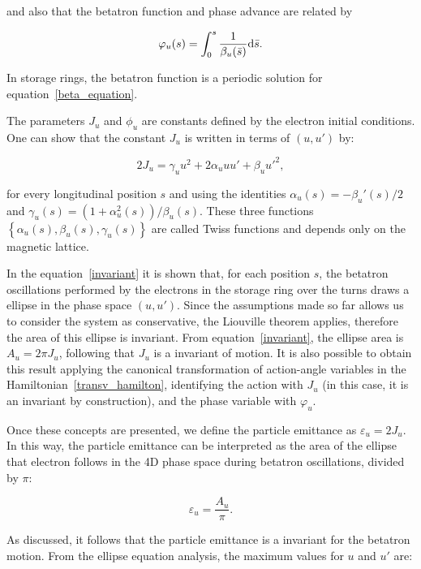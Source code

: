 and also that the betatron function and phase advance are related by

\begin{equation}
\varphi_u(s) = \int_{0}^{s} \dfrac{1}{\beta_u(\bar{s})} \mathrm{d} \bar{s}.
\end{equation}

In storage rings, the betatron function is a periodic solution for equation~\eqref{beta_equation}.

The parameters $J_u$ and $\phi_u$ are constants defined by the electron initial conditions. One can show that the constant $J_u$ is written in terms of $(u, u')$ by:

\begin{equation}
    2J_u = \gamma_u u^2 + 2 \alpha_u u u' + \beta_u {u'}^2,
    \label{invariant}
\end{equation}

for every longitudinal position $s$ and using the identities $\alpha_u(s) = -\beta_u'(s)/2$ and $\gamma_u(s) = (1 + \alpha_u^2(s))/\beta_u(s)$. These three functions $\left\{\alpha_u(s), \beta_u(s), \gamma_u(s)\right\}$ are called Twiss functions and depends only on the magnetic lattice.

In the equation~\eqref{invariant} it is shown that, for each position $s$, the betatron oscillations performed by the electrons  in the storage ring over the turns draws a ellipse in the phase space $(u, u')$. Since the assumptions made so far allows us to consider the system as conservative, the Liouville theorem applies, therefore the area of this ellipse is invariant. From equation~\eqref{invariant}, the ellipse area is $A_u = 2 \pi J_u$, following that $J_u$ is a invariant of motion. It is also possible to obtain this result applying the canonical transformation of action-angle variables in the Hamiltonian~\eqref{transv_hamilton}, identifying the action with $J_u$ (in this case, it is an invariant by construction), and the phase variable with $\varphi_u$.

Once these concepts are presented, we define the particle emittance as $\varepsilon_u = 2J_u$. In this way, the particle emittance can be interpreted as the area of the ellipse that electron follows in the 4D phase space during betatron oscillations, divided by $\pi$:

\begin{equation}
    \varepsilon_u = \frac{A_u}{\pi}.
\end{equation}

As discussed, it follows that the particle emittance is a invariant for the betatron motion. From the ellipse equation analysis, the maximum values for $u$ and $u'$ are:

